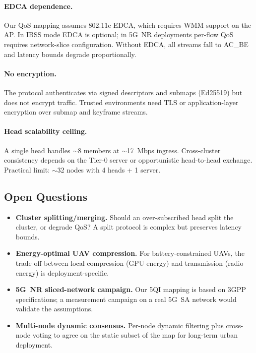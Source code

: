 \paragraph{EDCA dependence.} Our QoS mapping assumes 802.11e EDCA, which
requires WMM support on the AP. In IBSS mode EDCA is optional; in 5G~NR
deployments per-flow QoS requires network-slice configuration. Without
EDCA, all streams fall to AC\_BE and latency bounds degrade
proportionally.

\paragraph{No encryption.} The protocol authenticates via signed
descriptors and submaps (Ed25519) but does not encrypt traffic. Trusted
environments need TLS or application-layer encryption over submap and
keyframe streams.

\paragraph{Head scalability ceiling.} A single head handles $\sim$8 members
at $\sim$17~Mbps ingress. Cross-cluster consistency depends on the Tier-0
server or opportunistic head-to-head exchange. Practical limit: $\sim$32
nodes with 4 heads + 1 server.

\subsection{Open Questions}

\begin{itemize}
  \item \textbf{Cluster splitting/merging.} Should an over-subscribed head
    split the cluster, or degrade QoS? A split protocol is complex but
    preserves latency bounds.
  \item \textbf{Energy-optimal UAV compression.} For battery-constrained
    UAVs, the trade-off between local compression (GPU energy) and
    transmission (radio energy) is deployment-specific.
  \item \textbf{5G~NR sliced-network campaign.} Our 5QI mapping is based on
    3GPP specifications; a measurement campaign on a real 5G~SA network
    would validate the assumptions.
  \item \textbf{Multi-node dynamic consensus.} Per-node dynamic filtering
    plus cross-node voting to agree on the static subset of the map for
    long-term urban deployment.
\end{itemize}
